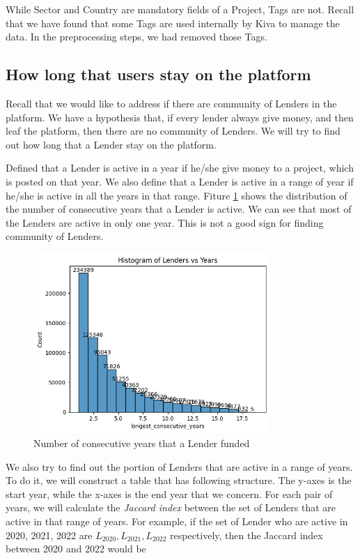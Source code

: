 

While Sector and Country are mandatory fields of a Project, Tags are not.
Recall that we have found that some Tags are used internally by Kiva to manage the data.
In the preprocessing steps, we had removed those Tags.


\subsection{How long that users stay on the platform}

Recall that we would like to address if there are community of Lenders in the platform.
We have a hypothesis that, if every lender always give money, and then leaf the platform,
then there are no community of Lenders.
We will try to find out how long that a Lender stay on the platform.

Defined that a Lender is active in a year if he/she give money to a project, which is posted on that year.
We also define that a Lender is active in a range of year if he/she is active in all the years in that range.
Fiture \ref{fig:active-hist} shows the distribution of the number of consecutive years that a Lender is active.
We can see that most of the Lenders are active in only one year.
This is not a good sign for finding community of Lenders.


\begin{figure}[H]
	\centering
	\includegraphics[width=0.8\textwidth]{images/active-hist.png}
	\caption{Number of consecutive years that a Lender funded}
	\label{fig:active-hist}
\end{figure}

We also try to find out the portion of Lenders that are active in a range of years.
To do it, we will construct a table that has following structure.
The y-axes is the start year,
while the x-axes is the end year that we concern.
For each pair of years, we will calculate the \textit{Jaccard index}
between the set of Lenders that are active in that range of years.
For example, if the set of Lender who are active in 2020, 2021, 2022 are
$L_{2020}, L_{2021}, L_{2022}$ respectively,
then the Jaccard index between 2020 and 2022 would be


